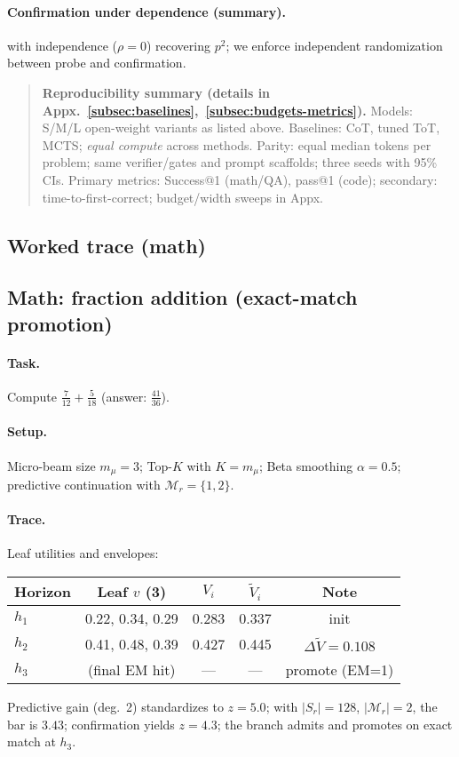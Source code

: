 \documentclass{article}
\begin{document}
\paragraph{Confirmation under dependence (summary).}
with independence ($\rho\!=\!0$) recovering $p^2$; we enforce independent randomization between probe and confirmation.



\begin{quote}\small
\textbf{Reproducibility summary (details in Appx.~\ref{subsec:baselines},~\ref{subsec:budgets-metrics}).}
Models: S/M/L open-weight variants as listed above. Baselines: CoT, tuned ToT, MCTS; \emph{equal compute} across methods.
Parity: equal median tokens per problem; same verifier/gates and prompt scaffolds; three seeds with 95\% CIs.
Primary metrics: Success@1 (math/QA), pass@1 (code); secondary: time-to-first-correct; budget/width sweeps in Appx.
\end{quote}

\subsection{Worked trace (math)}
\subsection{Math: fraction addition (exact-match promotion)}
\paragraph{Task.} Compute $\frac{7}{12}+\frac{5}{18}$ (answer: $\frac{41}{36}$).
\paragraph{Setup.} Micro-beam size $m_\mu{=}3$; Top-$K$ with $K=m_\mu$; Beta smoothing $\alpha{=}0.5$; predictive continuation with $\mathcal{M}_r{=}\{1,2\}$.
\paragraph{Trace.} Leaf utilities and envelopes:
\begin{center}
\begin{tabular}{lcccc}
\toprule
Horizon & Leaf $v$ (3) & $V_i$ & $\tilde V_i$ & Note \\
\midrule
$h_1$ & 0.22, 0.34, 0.29 & 0.283 & 0.337 & init \\
$h_2$ & 0.41, 0.48, 0.39 & 0.427 & 0.445 & $\Delta\tilde V{=}0.108$ \\
$h_3$ & (final EM hit)   & ---    & ---    & promote (EM=1) \\
\bottomrule
\end{tabular}
\end{center}
\noindent Predictive gain (deg.\ 2) standardizes to $z{=}5.0$; with $|S_r|{=}128$, $|\mathcal{M}_r|{=}2$, the bar is $3.43$; confirmation yields $z{=}4.3$; the branch admits and promotes on exact match at $h_3$.
\end{document}
